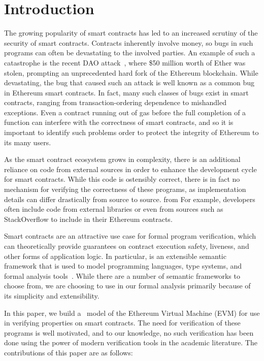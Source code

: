 \section{Introduction}
The growing popularity of smart contracts has led to an increased scrutiny of
the security of smart contracts. Contracts inherently involve money, so bugs in
such programs can often be devastating to the involved parties. An example of
such a catastrophe is the recent DAO attack~\cite{dao-attack}, where \$50
million worth of Ether was stolen, prompting an unprecedented hard fork of the
Ethereum blockchain. While devastating, the bug that caused such an attack is
well known as a common bug in Ethereum smart contracts. In fact, many such
classes of bugs exist in smart contracts, ranging from transaction-ordering
dependence to mishandled exceptions. Even a contract running out of gas before
the full completion of a function can interfere with the correctness of smart
contracts, and so it is important to identify such problems order to protect the integrity of Ethereum to its many users.

As the smart contract ecosystem grows in complexity, there is an additional
reliance on code from external sources in order to enhance the development cycle
for smart contracts. While this code is ostensibly correct, there is in fact no
mechanism for verifying the correctness of these programs, as implementation
details can differ drastically from source to source. from For example,
developers often include code from external libraries or even from sources such as
StackOverflow to include in their Ethereum contracts.

Smart contracts are an attractive use case for formal program verification, which
can theoretically provide guarantees on contract execution safety,
liveness, and other forms of application logic. In particular, \K{} is an
extensible semantic framework that is used to model programming languages, type
systems, and formal analysis tools~\cite{rosu-serbanuta-2010-jlap}. While there
are a number of semantic frameworks to choose from, we are choosing to use \K{} in
our formal analysis primarily because of its simplicity and extensibility.

In this paper, we build a \K{}~model of the Ethereum Virtual Machine (EVM) for use
in verifying properties on smart contracts. The need for verification of these
programs is well motivated, and to our knowledge, no such verification has been
done using the power of modern verification tools in the academic literature.
The contributions of this paper are as follows:


